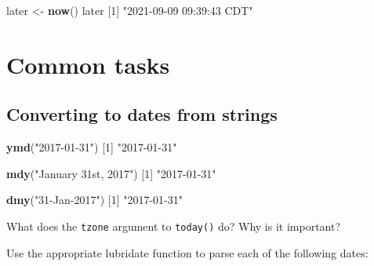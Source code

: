 \documentclass[
]{book}
\newenvironment{Shaded}{\begin{snugshade}}{\end{snugshade}}
\newcommand{\DecValTok}[1]{\textcolor[rgb]{0.00,0.00,0.81}{#1}}
\newcommand{\KeywordTok}[1]{\textcolor[rgb]{0.13,0.29,0.53}{\textbf{#1}}}
\newcommand{\NormalTok}[1]{#1}
\newcommand{\StringTok}[1]{\textcolor[rgb]{0.31,0.60,0.02}{#1}}
\begin{document}
\begin{Shaded}
\begin{Highlighting}[]
\NormalTok{later <-}\StringTok{ }\KeywordTok{now}\NormalTok{()}
\NormalTok{later}
\NormalTok{[}\DecValTok{1}\NormalTok{] }\StringTok{"2021-09-09 09:39:43 CDT"}
\end{Highlighting}
\end{Shaded}

\hypertarget{common-tasks}{%
\section*{Common tasks}\label{common-tasks}}

\hypertarget{converting-to-dates-from-strings}{%
\subsection*{Converting to dates from strings}\label{converting-to-dates-from-strings}}

\begin{Shaded}
\begin{Highlighting}[]
\KeywordTok{ymd}\NormalTok{(}\StringTok{"2017-01-31"}\NormalTok{)}
\NormalTok{[}\DecValTok{1}\NormalTok{] }\StringTok{"2017-01-31"}
\end{Highlighting}
\end{Shaded}

\begin{Shaded}
\begin{Highlighting}[]
\KeywordTok{mdy}\NormalTok{(}\StringTok{"January 31st, 2017"}\NormalTok{)}
\NormalTok{[}\DecValTok{1}\NormalTok{] }\StringTok{"2017-01-31"}
\end{Highlighting}
\end{Shaded}

\begin{Shaded}
\begin{Highlighting}[]
\KeywordTok{dmy}\NormalTok{(}\StringTok{"31-Jan-2017"}\NormalTok{)}
\NormalTok{[}\DecValTok{1}\NormalTok{] }\StringTok{"2017-01-31"}
\end{Highlighting}
\end{Shaded}

What does the \texttt{tzone} argument to \texttt{today()} do? Why is it important?

Use the appropriate lubridate function to parse each of the following dates:
\end{document}
